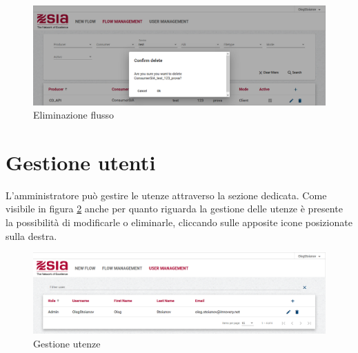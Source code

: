 \begin{figure}
\begin{center}
\includegraphics[width=1.0\columnwidth]{images/delete.png}
\end{center}
\caption{Eliminazione flusso}
\label{fig:delete}
\end{figure}

\section{Gestione utenti}

L'amministratore può gestire le utenze attraverso la sezione dedicata. Come visibile in figura \ref{fig:users} anche per quanto riguarda la gestione delle utenze è presente la possibilità di modificarle o eliminarle, cliccando sulle apposite icone posizionate sulla destra.



\begin{figure}
\begin{center}
\includegraphics[width=1.0\columnwidth]{images/users.png}
\end{center}
\caption{Gestione utenze}
\label{fig:users}
\end{figure}
